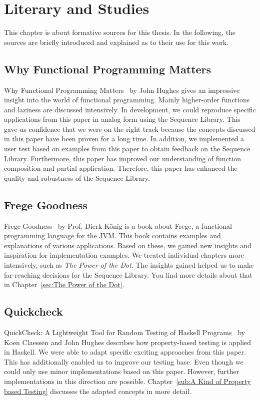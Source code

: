 \section{Literary and Studies}
\label{sec:Literary and Studies}
This chapter is about formative sources for this thesis. In the following, the
sources are briefly introduced and explained as to their use for this work.

\subsection{Why Functional Programming Matters}
\label{sub:Functional Programming Matters}
Why Functional Programming Matters~\cite{hughes_why_1989} by John Hughes gives an 
impressive insight into the world of functional
programming. Mainly higher-order functions and laziness are discussed
intensively. In development, we could reproduce specific applications from this
paper in analog form using the Sequence Library. This gave us confidence that
we were on the right track because the concepts discussed in this paper have
been proven for a long time. In addition, we implemented a user test based on
examples from this paper to obtain feedback on the Sequence Library.
\newline
Furthermore, this paper has improved our understanding of function composition
and partial application. Therefore, this paper has enhanced the quality and
robustness of the Sequence Library.

\subsection{Frege Goodness}
\label{sub:Frege Goodness}
Frege Goodness~\cite{frege_goodness} by Prof. Dierk König is a book about Frege, a functional
programming language for the JVM. This book contains examples and
explanations of various applications. Based on these, we gained new insights and inspiration for
implementation examples. We treated individual chapters more intensively, such
as \textit{The Power of the Dot}. The insights gained helped us to make far-reaching
decisions for the Sequence Library. You find more details about that in
Chapter~\ref{sec:The Power of the Dot}.

\subsection{Quickcheck}
\label{sub:Quickcheck}
QuickCheck: A Lightweight Tool for Random Testing
of Haskell Programs~\cite{quickcheck_hughes} by Koen Claessen and John Hughes describes how
property-based testing is applied in Haskell. We were able to adapt specific
exciting approaches from this paper. This has additionally enabled us to
improve our testing base. Even though we could only use minor implementations
based on this paper. However, further implementations in this direction are
possible. Chapter~\ref{sub:A Kind of Property based Testing} discusses the
adapted concepts in more detail. 

